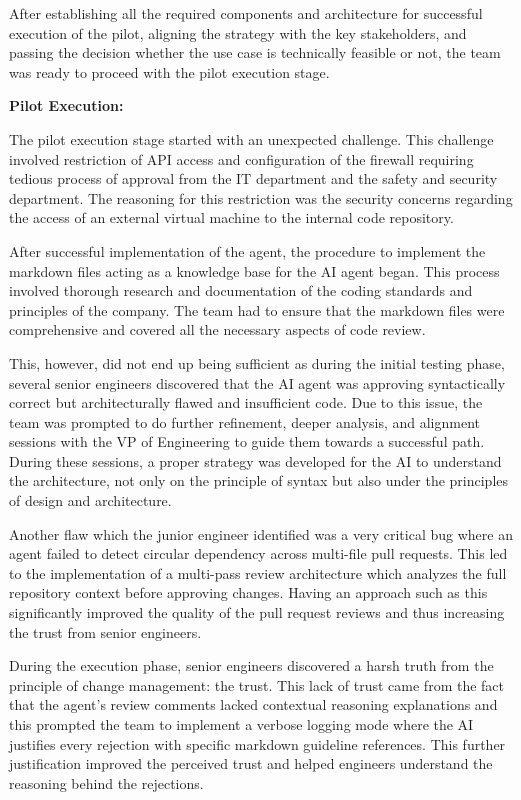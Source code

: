 \documentclass[]{imc-inf}
\begin{document}
After establishing all the required components and architecture for successful execution of the pilot, aligning the strategy with the key stakeholders, and passing the decision whether the use case is technically feasible or not, the team was ready to proceed with the pilot execution stage. 

\textbf{Pilot Execution:}
	
	The pilot execution stage started with an unexpected challenge. This challenge involved restriction of API access and configuration of the firewall requiring tedious process of approval from the IT department and the safety and security department. The reasoning for this restriction was the security concerns regarding the access of an external virtual machine to the internal code repository. 

	After successful implementation of the agent, the procedure to implement the markdown files acting as a knowledge base for the AI agent began. This process involved thorough research and documentation of the coding standards and principles of the company. The team had to ensure that the markdown files were comprehensive and covered all the necessary aspects of code review.
	

	This, however, did not end up being sufficient as during the initial testing phase, several senior engineers discovered that the AI agent was approving syntactically correct but architecturally flawed and insufficient code.
	Due to this issue, the team was prompted to do further refinement, deeper analysis, and alignment sessions with the VP of Engineering to guide them towards a successful path. During these sessions, a proper strategy was developed for the AI to understand the architecture, not only on the principle of syntax but also under the principles of design and architecture. 

	Another flaw which the junior engineer identified was a very critical bug where an agent failed to detect circular dependency across multi-file pull requests. This led to the implementation of a multi-pass review architecture which analyzes the full repository context before approving changes. Having an approach such as this significantly improved the quality of the pull request reviews and thus increasing the trust from senior engineers.

	During the execution phase, senior engineers discovered a harsh truth from the principle of change management: the trust.
	This lack of trust came from the fact that the agent's review comments lacked contextual reasoning explanations and this prompted the team to implement a verbose logging mode where the AI justifies every rejection with specific markdown guideline references. 
	This further justification improved the perceived trust and helped engineers understand the reasoning behind the rejections.
	
\end{document}
